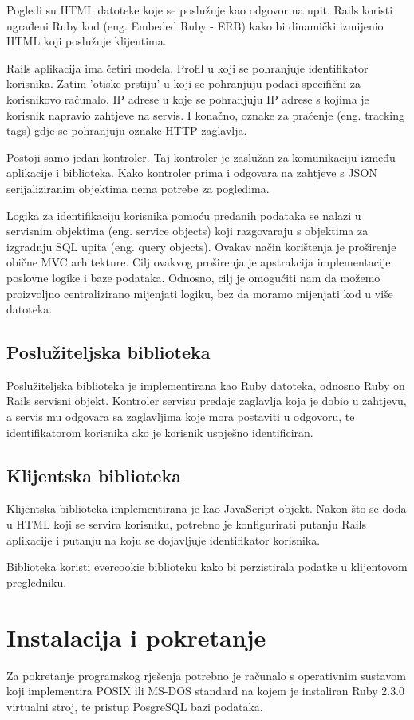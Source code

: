 \documentclass[times, utf8, zavrsni]{fer}
\begin{document}
Pogledi su HTML datoteke koje se poslužuje kao odgovor na upit. Rails koristi
ugrađeni Ruby kod (eng. Embeded Ruby - ERB) kako bi dinamički izmijenio HTML
koji poslužuje klijentima.

Rails aplikacija ima četiri modela. Profil u koji se pohranjuje identifikator
korisnika. Zatim 'otiske prstiju' u koji se pohranjuju podaci specifični za
korisnikovo računalo. IP adrese u koje se pohranjuju IP adrese s kojima je
korisnik napravio zahtjeve na servis. I konačno, oznake za praćenje (eng.
tracking tags) gdje se pohranjuju oznake HTTP zaglavlja.

Postoji samo jedan kontroler. Taj kontroler je zaslužan za komunikaciju između
aplikacije i biblioteka. Kako kontroler prima i odgovara na zahtjeve s JSON
serijaliziranim objektima nema potrebe za pogledima.

Logika za identifikaciju korisnika pomoću predanih podataka se nalazi u
servisnim objektima (eng. service objects) koji razgovaraju s objektima za
izgradnju SQL upita (eng. query objects). Ovakav način korištenja je proširenje
obične MVC arhitekture. Cilj ovakvog proširenja je apstrakcija implementacije
poslovne logike i baze podataka. Odnosno, cilj je omogućiti nam da možemo
proizvoljno centralizirano mijenjati logiku, bez da moramo mijenjati kod u više
datoteka.

\section{Poslužiteljska biblioteka}
Poslužiteljska biblioteka je implementirana kao Ruby datoteka, odnosno Ruby on
Rails servisni objekt. Kontroler servisu predaje zaglavlja koja je dobio u
zahtjevu, a servis mu odgovara sa zaglavljima koje mora postaviti u odgovoru,
te identifikatorom korisnika ako je korisnik uspješno identificiran.

\section{Klijentska biblioteka}
Klijentska biblioteka implementirana je kao JavaScript objekt. Nakon što se
doda u HTML koji se servira korisniku, potrebno je konfigurirati putanju
Rails aplikacije i putanju na koju se dojavljuje identifikator korisnika.

Biblioteka koristi evercookie biblioteku kako bi perzistirala podatke u
klijentovom pregledniku.

\chapter{Instalacija i pokretanje}
Za pokretanje programskog rješenja potrebno je računalo s operativnim sustavom
koji implementira POSIX ili MS-DOS standard na kojem je instaliran Ruby 2.3.0
virtualni stroj, te pristup PosgreSQL bazi podataka.
\end{document}
